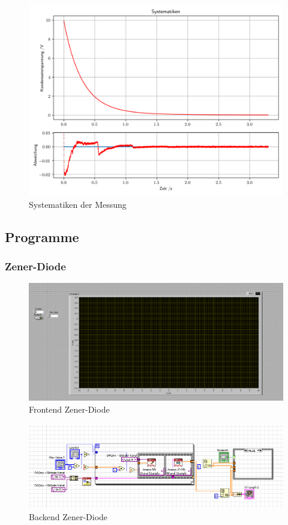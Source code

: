 \documentclass[12pt,twoside,a4paper]{scrartcl}
\begin{document}
			\begin{figure}[H]
				\centering
				\includegraphics[width = \textwidth]{Plots/Capacitor/CapacitorSystematiken}
				\caption{Systematiken der Messung}
			\end{figure}

\newpage
	\subsection{Programme}
		\subsubsection{Zener-Diode}

		\begin{figure}[H]
			\centering
			\includegraphics[width = 0.9 \textwidth]{Pictures/Programme/Frontend_Zener}
			\caption{Frontend Zener-Diode}
		\end{figure}

			\begin{figure}[H]
				\centering
				\includegraphics[width = 0.9 \textwidth]{Pictures/Programme/Backend_Zener}
				\caption{Backend Zener-Diode}
			\end{figure}
\end{document}
